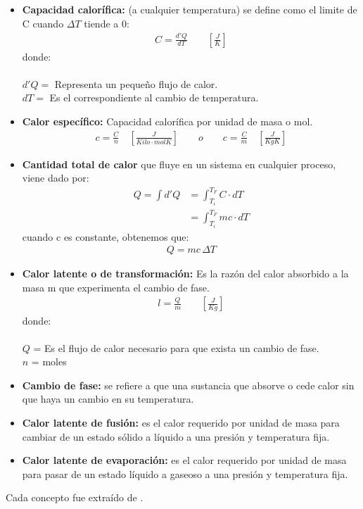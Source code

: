 \documentclass[a4paper, 12p]{article}
\begin{document}
\begin{itemize}
      \item \textbf{Capacidad calorífica: }(a cualquier temperatura) se define como  el limite de C cuando $\varDelta T$ tiende a 0:
      \begin{align}
            C = \frac{d'Q}{dT}           \qquad \left[\frac{J}{K}\right]              
      \end{align}
      donde: \\ \\
      $d'Q = $ Representa un pequeño flujo de calor. \\
      $dT = $ Es el correspondiente al cambio de temperatura. 

      \item \textbf{Calor específico: } Capacidad calorífica por unidad de masa o mol.
      \begin{align}
            c = \frac{C}{n}   \quad \left[\frac{J}{Kilo\cdot molK}\right]  \qquad o  \qquad c = \frac{C}{m} \quad \left[\frac{J}{KgK}\right]
      \end{align}

      \item \textbf{Cantidad total de calor } que fluye en un sistema en cualquier proceso, viene dado por:
      \begin{align}
            Q = \int d'Q &= \int_{T_i}^{T_F} C\cdot dT \\ \nonumber
                         &= \int_{T_i}^{T_F} mc\cdot dT
      \end{align}
      cuando c es constante, obtenemos que:
      \begin{align}
            Q = mc \, \varDelta T
      \end{align}

      \item \textbf{Calor latente o de transformación: } Es la razón del calor absorbido a la masa m que experimenta el cambio de fase. 
      \begin{align}
            l = \frac{Q}{m}                \qquad \left[\frac{J}{Kg}\right]
      \end{align}
      donde: \\ \\
      $Q$ = Es el flujo de calor necesario para que exista un cambio de fase.\\
      $n$ = moles

      \item \textbf{Cambio de fase: } se refiere a que una sustancia que absorve o cede calor sin que haya un cambio en su temperatura.
      \item \textbf{Calor latente de fusión: }es el calor requerido por unidad de masa para cambiar de un estado sólido a líquido a una presión y temperatura fija.
      \item \textbf{Calor latente de evaporación: } es el calor requerido por unidad de masa para pasar de un estado líquido a gaseoso a una presión y temperatura fija.
\end{itemize} 
Cada concepto fue extraído de \cite{libro}. \\
\end{document}
